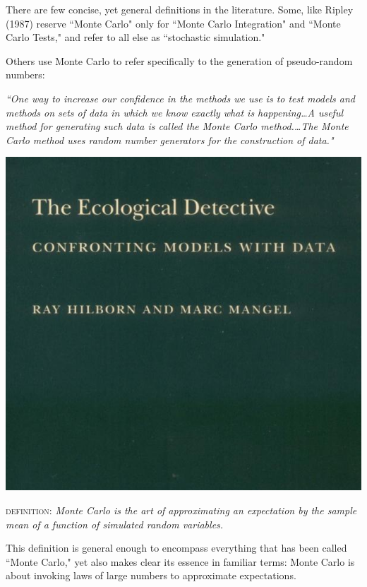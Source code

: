 There are few concise, yet general definitions in the literature.  Some, like Ripley (1987) reserve ``Monte Carlo" only for ``Monte Carlo Integration" and ``Monte Carlo Tests," and refer to all else as ``stochastic simulation."

Others use Monte Carlo to refer specifically to the generation of pseudo-random numbers:
   
\begin{minipage}{.60\textwidth }
{\sl ``One way to increase our confidence in the methods we use is to test models and methods on sets of data in which we know exactly what is happening\ldots A useful method for generating such data is called the Monte Carlo method.\ldots The Monte Carlo method uses random number generators for the construction of data."}
\end{minipage}
\hfill
\begin{minipage}{.35\textwidth }
\includegraphics[width=\textwidth]{illus/ecodetect}
\end{minipage}


\textsc{definition}: {\sl Monte Carlo is the art of approximating an expectation by the sample mean of a function of simulated random variables.}

This definition is general enough to encompass everything that has been called ``Monte Carlo," yet also makes clear its essence in familiar terms: Monte Carlo is about invoking laws of large numbers to approximate expectations.

